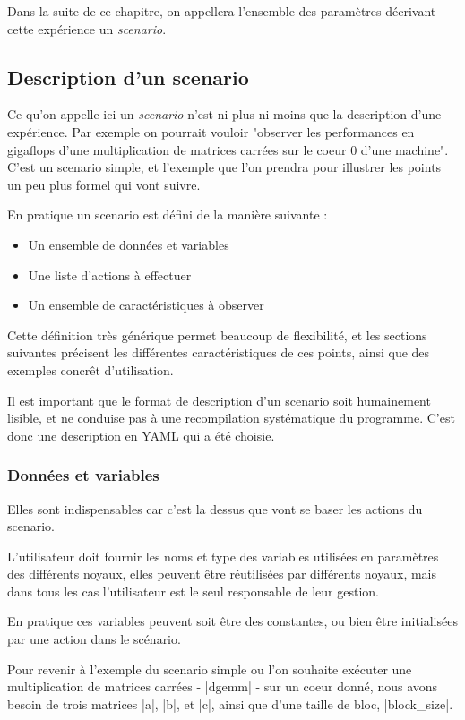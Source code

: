 Dans la suite de ce chapitre, on appellera l'ensemble des paramètres décrivant cette expérience un \emph{scenario}.

\subsection{Description d'un scenario}

Ce qu'on appelle ici un \emph{scenario} n'est ni plus ni moins que la description d'une expérience.
Par exemple on pourrait vouloir "observer les performances en gigaflops d'une multiplication de matrices carrées sur le coeur 0 d'une machine".
C'est un scenario simple, et l'exemple que l'on prendra pour illustrer les points un peu plus formel qui vont suivre.

En pratique un scenario est défini de la manière suivante :
\begin{itemize}
 \item Un ensemble de données et variables
 \item Une liste d'actions à effectuer
 \item Un ensemble de caractéristiques à observer
\end{itemize}

Cette définition très générique permet beaucoup de flexibilité, et les sections suivantes précisent les différentes caractéristiques de ces points, ainsi que des exemples concrêt d'utilisation.

Il est important que le format de description d'un scenario soit humainement lisible, et ne conduise pas à une recompilation systématique du programme. C'est donc une description en YAML qui a été choisie.

\subsubsection{Données et variables}

Elles sont indispensables car c'est la dessus que vont se baser les actions du scenario.

L'utilisateur doit fournir les noms et type des variables utilisées en paramètres des différents noyaux, elles peuvent être réutilisées par différents noyaux, mais dans tous les cas l'utilisateur est le seul responsable de leur gestion.

En pratique ces variables peuvent soit être des constantes, ou bien être initialisées par une action dans le scénario.

Pour revenir à l'exemple du scenario simple ou l'on souhaite exécuter une multiplication de matrices carrées - |dgemm| - sur un coeur donné, nous avons besoin de trois matrices |a|, |b|, et |c|, ainsi que d'une taille de bloc, |block_size|.


